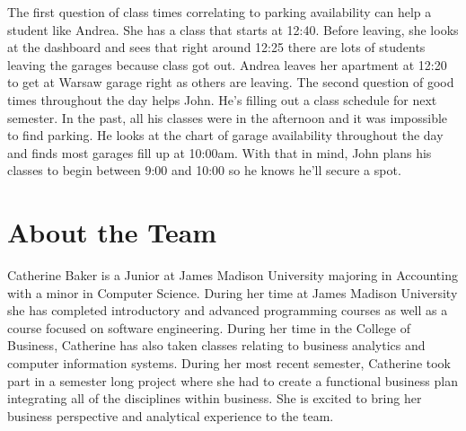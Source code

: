 \documentclass[11pt]{article}
\begin{document}
The first question of class times correlating to parking availability can help a student like Andrea. She has a class that starts at 12:40. Before leaving, she looks at the dashboard and sees that right around 12:25 there are lots of students leaving the garages because class got out. Andrea leaves her apartment at 12:20 to get at Warsaw garage right as others are leaving. The second question of good times throughout the day helps John. He's filling out a class schedule for next semester. In the past, all his classes were in the afternoon and it was impossible to find parking. He looks at the chart of garage availability throughout the day and finds most garages fill up at 10:00am. With that in mind, John plans his classes to begin between 9:00 and 10:00 so he knows he'll secure a spot.

\section*{About the Team}



Catherine Baker is a Junior at James Madison University majoring in Accounting with a minor in Computer Science. During her time at James Madison University she has completed introductory and advanced programming courses as well as a course focused on software engineering. During her time in the College of Business, Catherine has also taken classes relating to business analytics and computer information systems. During her most recent semester, Catherine took part in a semester long project where she had to create a functional business plan integrating all of the disciplines within business. She is excited to bring her business perspective and analytical experience to the team. 
\end{document}
